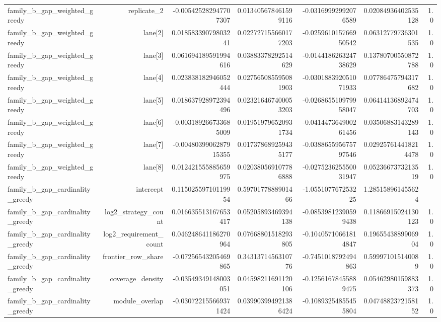{\begin{longtable}{lrrrrrr}
family\_b\_gap\_weighted\_greedy & replicate\_2 & -0.005425282947707307 & 0.013405678461599116 & -0.03169992992076589 & 0.02084936402535128 & 1.0 \\
family\_b\_gap\_weighted\_greedy & lane[2] & 0.01858339079803241 & 0.022727155660177203 & -0.025961015766950542 & 0.06312779736301535 & 1.0 \\
family\_b\_gap\_weighted\_greedy & lane[3] & 0.061694189591994616 & 0.03883378292514629 & -0.014418626324738629 & 0.13780700550872788 & 1.0 \\
family\_b\_gap\_weighted\_greedy & lane[4] & 0.023838182946052444 & 0.027565085595081903 & -0.030188392051071933 & 0.07786475794317682 & 1.0 \\
family\_b\_gap\_weighted\_greedy & lane[5] & 0.018637928972394496 & 0.023216467400053203 & -0.026865510979958047 & 0.06414136892474703 & 1.0 \\
family\_b\_gap\_weighted\_greedy & lane[6] & -0.003189266733685009 & 0.019519796520931734 & -0.041447364900261456 & 0.03506883143289143 & 1.0 \\
family\_b\_gap\_weighted\_greedy & lane[7] & -0.0048039906287915355 & 0.017378689259435177 & -0.038865595675797546 & 0.029257614418214478 & 1.0 \\
family\_b\_gap\_weighted\_greedy & lane[8] & 0.012421555885659975 & 0.020380569107786888 & -0.027523625550031947 & 0.0523667373213519 & 1.0 \\
family\_b\_gap\_cardinality\_greedy & intercept & 0.11502559710119954 & 0.5970177888901466 & -1.055107767253225 & 1.285158961455624 &  \\
family\_b\_gap\_cardinality\_greedy & log2\_strategy\_count & 0.016635513167653417 & 0.05205893469394138 & -0.08539812390599438 & 0.11866915024130123 & 1.0 \\
family\_b\_gap\_cardinality\_greedy & log2\_requirement\_count & 0.046248641186270964 & 0.07668801518293805 & -0.10405710661814847 & 0.1965543889906904 & 1.0 \\
family\_b\_gap\_cardinality\_greedy & frontier\_row\_share & -0.07256543205469865 & 0.3431371456310776 & -0.7451018792494863 & 0.599971015140089 & 1.0 \\
family\_b\_gap\_cardinality\_greedy & coverage\_density & -0.03549349148003051 & 0.04598211691120106 & -0.12561678455889475 & 0.05462980159883373 & 1.0 \\
family\_b\_gap\_cardinality\_greedy & module\_overlap & -0.030722155669371424 & 0.039903994921386424 & -0.10893254855455804 & 0.0474882372158152 & 1.0 \\

\end{longtable}}

